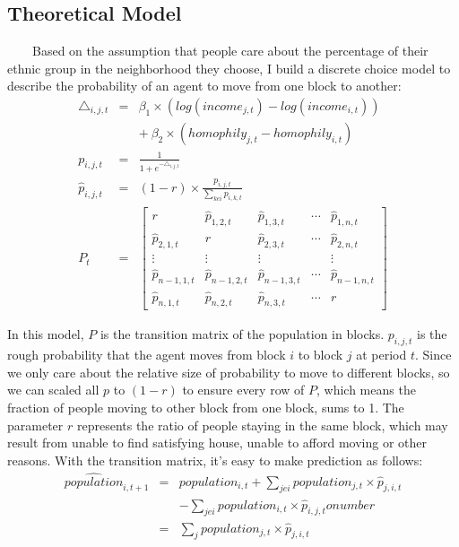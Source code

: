 \documentclass{article}
\begin{document}
\subsection{Theoretical Model}
\par \ \ \ \ Based on the assumption that people care about the percentage of their ethnic group in the neighborhood they choose, I build a discrete choice model to describe the probability of an agent to move from one block to another:
\begin{eqnarray}
\triangle_{i,j,t} &=& \beta_1 \times (log(income_{j,t})-log(income_{i,t})) \nonumber\\
&\;&+\ \beta_2 \times (homophily_{j,t}-homophily_{i,t})\\ 
p_{i,j,t} &=& \frac{1}{1+e^{-\triangle_{i,j,t}}}\\
\hat{p}_{i,j,t} &=& (1-r)\times\frac{p_{i,j,t}}{\sum_{ke i} p_{i,k,t}}\\
P_t &=& 
\left[
\begin{array}{ccccc}
r & \hat{p}_{1,2,t} & \hat{p}_{1,3,t} & \cdots & \hat{p}_{1,n,t} \\
\hat{p}_{2,1,t} & r & \hat{p}_{2,3,t} & \cdots & \hat{p}_{2,n,t} \\
\vdots & \vdots & \vdots &  & \vdots \\
\hat{p}_{n-1,1,t} & \hat{p}_{n-1,2,t} & \hat{p}_{n-1,3,t} & \cdots & \hat{p}_{n-1,n,t}\\
\hat{p}_{n,1,t} & \hat{p}_{n,2,t} & \hat{p}_{n,3,t} & \cdots & r 
\end{array}
\right]
\end{eqnarray}
\par In this model, $P$ is the transition matrix of the population in blocks. $p_{i,j,t}$ is the rough probability that the agent moves from block $i$ to block $j$ at period $t$. Since we only care about the relative size of probability to move to different blocks, so we can scaled all $p$ to $(1-r)$ to ensure every row of $P$, which means the fraction of people moving to other block from one block, sums to 1. The parameter $r$ represents the ratio of people staying in the same block, which may result from unable to find satisfying house, unable to afford moving or other reasons. 
With the transition matrix, it’s easy to make prediction as follows:
\begin{eqnarray} 
\widehat{population}_{i,t+1} &=& population_{i,t} + \sum_{je i} population_{j,t}\times \hat{p}_{j,i,t} \nonumber\\ 
&\;& - \sum_{je i} population_{i,t}\times \hat{p}_{i,j,t} onumber\\ 
&=& \sum_{j} population_{j,t}\times \hat{p}_{j,i,t} 
\end{eqnarray}
\end{document}
